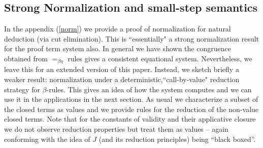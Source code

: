 					\subsection{Strong Normalization and small-step semantics}
					In the appendix (\ref{norm}) we provide a proof of normalization for  natural deduction (via cut elimination). 
					This is ``essentially" a strong normalization result for the proof term system also. In general we have shown the congruence obtained from $=_{\beta\eta}$ rules gives a  consistent equational system.
					Nevertheless, we leave this for an extended version of this paper. Instead, we sketch briefly a weaker result: normalization under a  deterministic,``call-by-value" reduction strategy for $\beta$-rules.
					This   gives
					an idea of how the system computes  and we can use it in the applications in the next section. As usual we characterize a subset of the closed terms as values and we provide rules for the reduction of the non-value closed terms.
					Note that for the constants of validity and their applicative closure we do not observe reduction properties but treat them as values -- again conforming with the idea of $J$ (and its reduction principles) being ``black boxed''.
